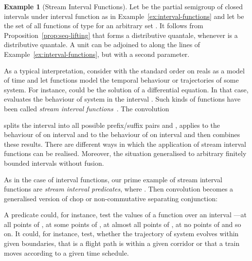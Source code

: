 \documentclass[12pt]{article}
\theoremstyle{definition}
\newtheorem{example}{Example}
\begin{document}
\begin{example}[Stream Interval
  Functions]\label{ex:stream-interval-functions}
  Let  be the partial semigroup  of closed
  intervals  under interval function as in
  Example~\ref{ex:interval-functions} and let  be the set of all
  functions of type  for an arbitrary set . It follows from
  Proposition~\ref{prop:seq-lifting} that  forms a
  distributive quantale, whenever  is a distributive quantale. A
  unit can be adjoined to  along the lines of
  Example~\ref{ex:interval-functions}, but with a second parameter.

  As a typical interpretation, consider  with the
  standard order on reals as a model of time and let functions
   model the temporal behaviour or trajectories of
  some system. For instance,  could be the solution of a
  differential equation. In that case,  evaluates the
  behaviour of system  in the interval . Such kinds of functions
  have been called \emph{stream interval functions}~\cite{DHD14}. The
  convolution
  
  splits the interval  into all possible prefix/suffix pairs 
  and , applies  to the behaviour of  on interval  and 
  to the behaviour of  on interval  and then combines these
  results. There are different ways in which the application of stream
  interval functions can be realised.  Moreover, the situation
  generalised to arbitrary finitely bounded intervals without fusion.

  As in the case of interval functions, our prime example of stream
  interval functions are \emph{stream interval predicates}, where
  . Then convolution becomes a generalised version of
  chop or non-commutative separating conjunction:
 
  A predicate  could, for instance, test the values of a function
   over an interval ---at all points of , at some points of
  , at almost all points of , at no points of  and so on. It
  could, for instance, test, whether the trajectory of system 
  evolves within given boundaries, that is a flight path is within a
  given corridor or that a train moves according to a given time
  schedule.


\end{example}
\end{document}
